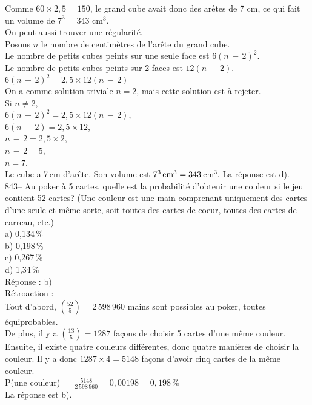 ﻿\documentclass[letterpaper, 12pt]{article}
\begin{document}
Comme $60\times2,5=150$, le grand cube avait donc des ar\^etes de 7
cm, ce qui fait un volume de $7^3 = 343$ cm${^3}$.\\

On peut aussi trouver une r\'egularit\'e.\\
Posons $n$ le nombre de centim\`etres de l'ar\^ete du grand cube.\\
Le nombre de petits cubes peints sur une seule face est $6\left(
n\,-\,2\right) ^{2}$.\\
Le nombre de petits cubes peints sur 2 faces est $12\left( n\,-\,2\right)
$.\\

$6\left( n\,-\,2\right) ^{2}=2,5\times12\left( n\,-\,2\right) $\\
On a comme solution triviale $n=2$, mais cette solution est \`a rejeter.\\

Si $n\neq2$,\\
$6\left( n\,-\,2\right) ^{2}=2,5\times12\left( n\,-\,2\right) $,\\
$6\left( n\,-\,2\right)=2,5\times12 $,\\
$ n\,-\,2=2,5\times2 $,\\
$ n\,-\,2=5 $,\\
$ n=7 $.\\
Le cube a 7\,cm d'ar\^ete.  Son volume est
$7^3\textrm{\,cm}^{3}=343$\,cm$^{3}$.  La r\'eponse est d).\\

843-- Au poker \`a 5 cartes, quelle est la probabilit\'e d'obtenir une
couleur si le jeu contient 52 cartes? (Une couleur est une main comprenant
uniquement des cartes d'une seule et m\^eme sorte, soit toutes des cartes de
coeur, toutes des cartes de carreau, etc.) \\
a) 0,134\,\%\\
b) 0,198\,\%\\
c) 0,267\,\%\\
d) 1,34\,\%\\

R\'eponse : b)\\

R\'etroaction : \\
Tout d'abord, $\binom{52}{5}=2\,598\,960$ mains sont possibles au poker,
toutes \'equiprobables.  \\[2mm]
De plus, il y a $\binom{13}{5}=1287$ fa\c cons de choisir 5 cartes d'une
m\^eme couleur.  Ensuite, il existe quatre couleurs diff\'erentes, donc
quatre mani\`eres de choisir la couleur.  Il y a donc $1287\times4=5148$
fa\c cons d'avoir cinq cartes de la m\^eme couleur.  \\[2mm]
P(une couleur) $=\frac{5148}{2\,598\,960}=0,00198=0,198\,\%$\\[2mm]
La r\'eponse est b).\\
\end{document}
